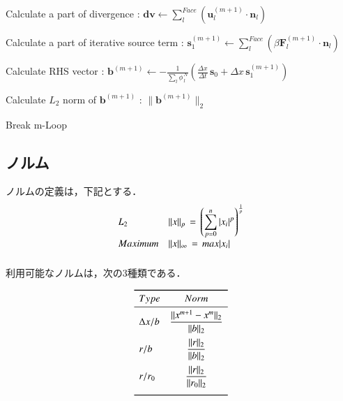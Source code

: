\begin{algorithm}
\begin{algorithmic}
\State Calculate a part of divergence : $\displaystyle{ \bm{dv} \gets \sum \limits_l^{Face} \left( \bm{u}^{(m+1)}_l \cdot \bm{n}_l \right) }$

\State Calculate a part of iterative source term : $\bm{s}_1^{(m+1)} \gets \sum \limits_l^{Face} \left( \beta \bm{F}_l^{(m+1)} \cdot \bm{n}_l \right)$

\State Calculate RHS vector : $ \displaystyle{ \bm{b}^{(m+1)} \gets - \frac{1}{\sum \limits_l \phi^{\,N}_{\,l}} \left( \frac{\Delta x}{\Delta t} \, \bm{s}_0 + \Delta x \, \bm{s}_1^{(m+1)} \right) }$

\State Calculate $L_2$ norm of $\bm{b}^{(m+1)}$ : $\| \bm{b}^{(m+1)} \|_2$

\State Break m-Loop
\EndIf

\EndFor

\end{algorithmic}
\end{algorithm}




%
\subsection{ノルム}
ノルムの定義は，下記とする．
\begin{equation}
\begin{array}{ll}
L_2 &
\displaystyle{ \| x \|_p \,=\, 
\left( \sum_{p=0}^n {|x_i|^p} \right)^{\frac{1}{p}}
}\\
\vspace{2mm}
Maximum & \| x \|_{\infty} \,=\, max|x_i|\\
\end{array}
\label{eq:def_norm}
\end{equation}

利用可能なノルムは，次の3種類である．

\begin{equation}
\begin{array}{lc} \toprule
Type & Norm \\ \midrule
\vspace{2mm}
\Delta x / b & \displaystyle{ \frac{\|x^{m+1}-x^m \|_2}{\|b\|_2} } \\ 
\vspace{2mm}
r/b & \displaystyle{ \frac{\| r \|_2}{\|b\|_2} } \\ 
\vspace{2mm}
r/r_0 & \displaystyle{ \frac{\|r\|_2}{\|r_0\|_2} } \\  \bottomrule
\end{array}
\label{eq:iter_norm}
\end{equation}






